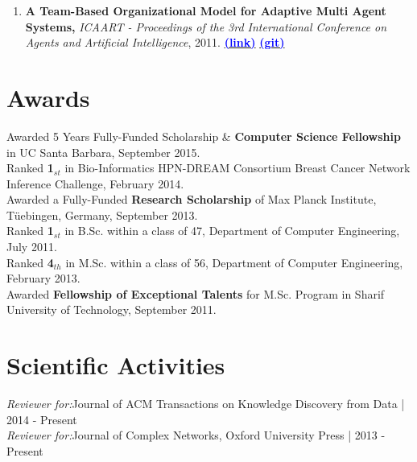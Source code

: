 \documentclass[letter]{res}
\begin{document}
\begin{resume}
\begin{enumerate}[leftmargin=-.01in]
			
			\item \textbf{A Team-Based Organizational Model for Adaptive Multi Agent Systems,} \textit{ICAART - Proceedings of the 3rd International Conference on Agents and Artificial Intelligence}, 2011.
			{\href{https://www.researchgate.net/publication/221539731_A_Team-based_Organizational_Model_for_Adaptive_Multi-agent_Systems}{\textbf{\textcolor{blue}{(link)}}}}
			{\href{https://github.com/omid55/team_based_rescue_jade_multi_agent_system}{\textbf{\textcolor{blue}{(git)}}}}
			
		\end{enumerate}
		
		
		\section{Awards}
		Awarded 5 Years Fully-Funded Scholarship \& \textbf{Computer Science Fellowship} in UC Santa Barbara, September 2015.\\
		Ranked \textbf{1}$_{st}$ in Bio-Informatics HPN-DREAM Consortium Breast Cancer Network Inference Challenge, February 2014.\\
		Awarded a Fully-Funded \textbf{Research Scholarship} of Max Planck Institute, Tüebingen, Germany, September 2013.\\
		Ranked \textbf{1}$_{st}$ in B.Sc. within a class of 47, Department of Computer Engineering, July 2011.\\
		Ranked \textbf{4}$_{th}$ in M.Sc. within a class of 56, Department of Computer Engineering, February 2013.\\
		Awarded \textbf{Fellowship of Exceptional Talents} for M.Sc. Program in Sharif University of Technology, September 2011.
		
		
		\section{Scientific Activities}
		{\sl Reviewer for:}Journal of ACM Transactions on Knowledge Discovery from Data | 2014 - Present\\
		{\sl Reviewer for:}Journal of Complex Networks, Oxford University Press | 2013 - Present
		

\end{resume}
\end{document}
